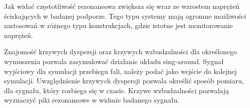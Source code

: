 Jak widać częstotliwość rezonansowa zwiększa się wraz ze wzrostem naprężeń ściskających w badanej podporze. Tego typu systemy mają ogromne możliwości zastosowań w różnego typu konstrukcjach, gdzie istotne jest monitorowanie naprężeń.

Znajomość krzywych dyspersji oraz krzywych wzbudzalności dla określonego wymuszenia pozwala zasymulować działanie układu sing-around. Sygnał wyjściowy dla symulacji przebiegu fali, należy podać jako wejście do kolejnej symulacji. Uwzględnienie krzywych dyspersji pozwala określić sposób pomiaru, dla sygnału, który rozbiega się w czasie. Krzywe wzbudzalności pozwalają wyznaczyć piki rezonansowe w widmie badanego sygnału.

